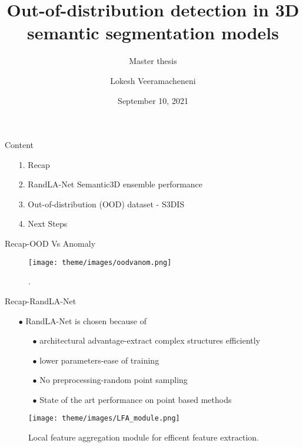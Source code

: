 \documentclass[aspectratio=169]{beamer}
\author[]{Lokesh Veeramacheneni}
\title{Out-of-distribution detection in 3D semantic segmentation models}
\subtitle{Master thesis}
\institute[HBRS]{Hochschule Bonn-Rhein-Sieg}
\date{September 10, 2021}
\begin{document}
{
\begin{frame}
\titlepage
\end{frame}
}

\begin{frame}{Content}
    \begin{itemize}
        \item[1.] Recap
        \item[2.] RandLA-Net Semantic3D ensemble performance
        \item[3.] Out-of-distribution (OOD) dataset - S3DIS
        \item[4.] Next Steps 
    \end{itemize}
\end{frame}
\begin{frame}{Recap-OOD Vs Anomaly}
    \begin{figure}
        \centering
        \texttt{[image: theme/images/oodvanom.png]}
        \caption{.}
    \end{figure}
\end{frame}
\begin{frame}{Recap-RandLA-Net}
    \begin{itemize}
        \item[$\bullet$] RandLA-Net is chosen because of
        \begin{itemize}
            \item[$\bullet$] architectural advantage-extract complex structures efficiently
            \item[$\bullet$] lower parameters-ease of training
            \item[$\bullet$] No preprocessing-random point sampling
            \item[$\bullet$] State of the art performance on point based methods 
        \end{itemize}
    \end{itemize}
    \begin{figure}
        \centering
        \texttt{[image: theme/images/LFA\_module.png]}
        \caption{Local feature aggregation module for efficent feature extraction.}
    \end{figure}
\end{frame}
\end{document}
